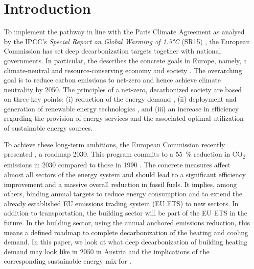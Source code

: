 \section{Introduction}
To implement the pathway in line with the Paris Climate Agreement \cite{agreement2015paris} as analyed by the IPCC's \emph{Special Report on Global Warming of 1.5°C} (SR15) \cite{book}, the European Commission has set deep decarbonization targets together with national governments. In particular, the  describes the concrete goals in Europe, namely, a climate-neutral and resource-conserving economy and society \cite{kemfert2019green}\deleted{)}. The overarching goal is to reduce carbon emissions to net-zero and hence achieve climate neutrality by 2050. The principles of a net-zero, decarbonized society are based on three key points: (i) reduction of the energy demand \cite{grubler2018low}\deleted{)}, (ii) deployment and generation of renewable energy technologies \cite{bakhtavar2020assessment}\deleted{)}, and (iii) an increase in efficiency regarding the provision of energy services and the associated optimal utilization of sustainable energy sources.\vspace{0.3cm}

To achieve these long-term ambitions, the European Commission recently presented , a  roadmap   2030. This program commits to a \SI{55}{\%} reduction in CO\textsubscript{2} emissions in 2030 compared to  those in 1990 \cite{european_commission_european_2019}. The concrete measures affect almost all sectors of the energy system and should lead to a significant efficiency improvement and a massive overall reduction in fossil fuels. It implies, among others, binding annual targets to reduce energy consumption and to extend the already established EU emissions trading system (EU ETS) to new sectors. In addition to transportation, the building sector will be part of the EU ETS in the future. In the building sector, using the annual anchored emissions reduction, this means a defined roadmap to complete decarbonization of the heating and cooling demand. In this paper, we look at what deep decarbonization of building heating demand may look like in 2050 in Austria and the implications of the corresponding sustainable energy mix for .

